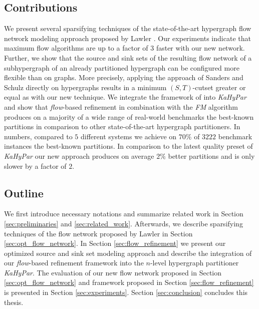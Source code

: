 \subsection{Contributions}

We present several sparsifying techniques of the state-of-the-art hypergraph flow network
modeling approach proposed by Lawler \cite{lawler1973}. Our experiments indicate that
maximum flow algorithms are up to a factor of $3$ faster with our new network. Further, 
we show that the source and sink sets of the resulting flow network of a subhypergraph 
of an already partitioned hypergraph can be configured more flexible than on graphs. More 
precisely, applying the approach of Sanders and Schulz \cite{sanders2011engineering}
directly on hypergraphs results in a minimum $(S,T)$-cutset greater or equal as with
our new technique. We integrate the framework of \cite{sanders2011engineering} into 
\emph{KaHyPar} and show that \emph{flow}-based refinement in combination with the
\emph{FM} algorithm produces on a majority of a wide range of real-world
benchmarks the best-known partitions in comparison to other state-of-the-art hypergraph
partitioners. In numbers, compared to $5$ different systems we achieve on $70\%$ 
of $3222$ benchmark instances the best-known partitions. In comparison to the 
latest quality preset of \emph{KaHyPar} our new approach produces on average $2\%$ better 
partitions and is only slower by a factor of $2$.

\subsection{Outline}

We first introduce necessary notations and summarize related work in Section \ref{sec:preliminaries}
and \ref{sec:related_work}. Afterwards, we describe sparsifying techniques of the flow network
proposed by Lawler \cite{lawler1973} in Section \ref{sec:opt_flow_network}. In Section
\ref{sec:flow_refinement} we present our optimized source and sink set modeling
approach and describe the integration of our \emph{flow}-based refinement framework into
the $n$-level hypergraph partitioner \emph{KaHyPar}. The evaluation of our new flow network
proposed in Section \ref{sec:opt_flow_network} and framework proposed in Section 
\ref{sec:flow_refinement} is presented in Section \ref{sec:experiments}. 
Section \ref{sec:conclusion} concludes this thesis.